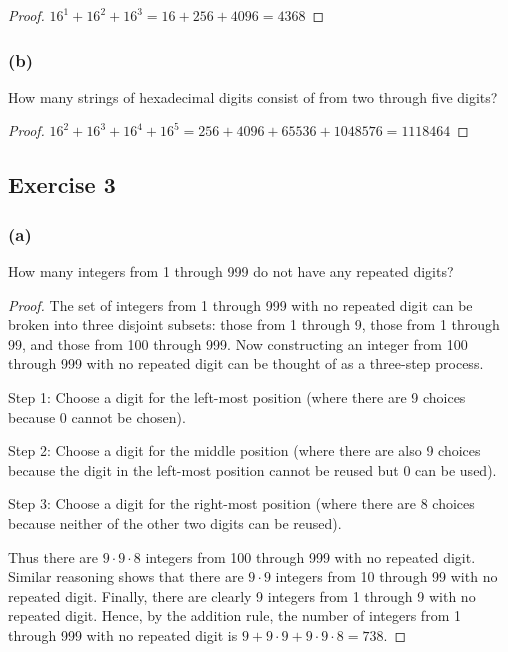 \documentclass[14pt]{extarticle}
\newcommand{\cy}{\color{cyan}}
\begin{document}
\begin{proof}
\(16^1 + 16^2 + 16^3 = 16 + 256 + 4096 = 4368\)
\end{proof}

\subsubsection{(b)}
How many strings of hexadecimal digits consist of from two through five digits?

\begin{proof}
\(16^2 + 16^3 + 16^4 + 16^5 = 256 + 4096 + 65536 + 1048576 = 1118464\)
\end{proof}

\subsection{Exercise 3}
\subsubsection{(a)}
How many integers from 1 through 999 do not have any repeated digits?

\begin{proof}
The set of integers from 1 through 999 with no repeated digit can be broken into three disjoint subsets: those from 
1 through 9, those from 1 through 99, and those from 100 through 999. Now constructing an integer from 100 through 
999 with no repeated digit can be thought of as a three-step process.

{\cy Step 1:} Choose a digit for the left-most position (where there are 9 choices because 0 cannot be chosen).

{\cy Step 2:} Choose a digit for the middle position (where there are also 9 choices because the digit in the left-most 
position cannot be reused but 0 can be used).

{\cy Step 3:} Choose a digit for the right-most position (where there are 8 choices because neither of the other two 
digits can be reused). 

Thus there are \(9 \cdot 9 \cdot 8\) integers from 100 through 999 with no repeated digit. Similar reasoning shows 
that there are \(9 \cdot 9\) integers from 10 through 99 with no repeated digit. Finally, there are clearly 9 
integers from 1 through 9 with no repeated digit. Hence, by the addition rule, the number of integers from 1 through 
999 with no repeated digit is \(9 + 9 \cdot 9 + 9 \cdot 9 \cdot 8 = 738\).
\end{proof}
\end{document}
